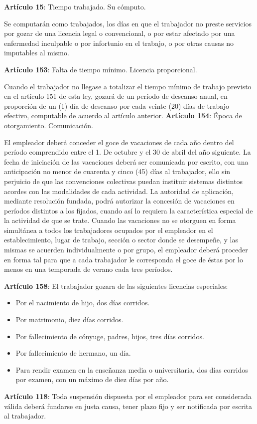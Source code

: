 \textbf{Artículo 15}: Tiempo trabajado. Su cómputo.

Se computarán como trabajados, los días en que el trabajador no preste servicios por gozar de una licencia legal o convencional, o por estar afectado por una enfermedad inculpable o por infortunio en el trabajo, o por otras causas no imputables al mismo.

\textbf{Artículo 153}: Falta de tiempo mínimo. Licencia proporcional.



Cuando el trabajador no llegase a totalizar el tiempo mínimo de trabajo previsto en el artículo 151 de esta ley, gozará de un período de descanso anual, en proporción de un (1) día de descanso por cada veinte (20) días de trabajo efectivo, computable de acuerdo al artículo anterior. \textbf{Artículo 154}: Época de otorgamiento. Comunicación.

El empleador deberá conceder el goce de vacaciones de cada año dentro del período comprendido entre el 1. De octubre y el 30 de abril del año siguiente. La fecha de iniciación de las vacaciones deberá ser comunicada por escrito, con una anticipación no menor de cuarenta y cinco (45) días al trabajador, ello sin perjuicio de que las convenciones colectivas puedan instituir sistemas distintos acordes con las modalidades de cada actividad. La autoridad de aplicación, mediante resolución fundada, podrá autorizar la concesión de vacaciones en períodos distintos a los fijados, cuando así lo requiera la característica especial de la actividad de que se trate. Cuando las vacaciones no se otorguen en forma simultánea a todos los trabajadores ocupados por el empleador en el establecimiento, lugar de trabajo, sección o sector donde se desempeñe, y las mismas se acuerden individualmente o por grupo, el empleador deberá proceder en forma tal para que a cada trabajador le corresponda el goce de éstas por lo menos en una temporada de verano cada tres períodos.

\textbf{Artículo 158}: El trabajador gozara de las siguientes licencias especiales:

\begin{itemize}
  \item Por el nacimiento de hijo, dos días corridos.
  \item Por matrimonio, diez días corridos.
  \item Por fallecimiento de cónyuge, padres, hijos, tres días corridos.
  \item Por fallecimiento de hermano, un día.
  \item Para rendir examen en la enseñanza media o universitaria, dos días corridos por examen, con un máximo de diez días por año.
\end{itemize}
\textbf{Artículo 118}: Toda suspensión dispuesta por el empleador para ser considerada válida deberá fundarse en justa causa, tener plazo fijo y ser notificada por escrita al trabajador.


